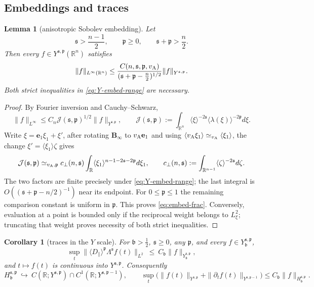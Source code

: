 \documentclass[11pt,reqno]{amsart}
\theoremstyle{plain}
\newtheorem{lemma}[theorem]{Lemma}
\newtheorem{corollary}[theorem]{Corollary}
\theoremstyle{definition}
\theoremstyle{remark}
\numberwithin{equation}{section}
\newcommand{\breg}{\mathfrak b}
\newcommand{\sreg}{\mathfrak s}
\newcommand{\preg}{\mathfrak p}
\newcommand{\Binf}{\mathbf B_\infty}
\newcommand{\Real}{\mathbb R}
\newcommand{\Rn}{\Real^n}
\begin{document}
\subsection{Embeddings and traces}

\begin{lemma}[anisotropic Sobolev embedding]\label{lem:Linftyembed}
Let
\begin{equation}\label{eq:Y-embed-range}
 \sreg>\frac{n-1}{2},\qquad \preg\ge0,\qquad \sreg+\preg>\frac n2 .
\end{equation}
Then every $f\in Y^{\sreg,\preg}(\Rn)$ satisfies
\begin{equation}\label{eq:embed-frac}
 \|f\|_{L^\infty(\Rn)}
 \le
 \frac{C(n,\sreg,\preg,v_{\rm A})}
 {(\sreg+\preg-\frac n2)^{1/2}}
 \|f\|_{Y^{\sreg,\preg}} .
\end{equation}
Both strict inequalities in \eqref{eq:Y-embed-range} are necessary.
\end{lemma}

\begin{proof}
By Fourier inversion and Cauchy--Schwarz,
\[
 \|f\|_{L^\infty}
 \le C_n\mathcal J(\sreg,\preg)^{1/2}\|f\|_{Y^{\sreg,\preg}},
 \qquad
 \mathcal J(\sreg,\preg)
 :=\int_{\Rn}
 \langle\xi\rangle^{-2\sreg}
 \langle\lambda(\xi)\rangle^{-2\preg} d\xi .
\]
Write $\xi=\mathbf e_1\xi_1+\xi'$, after rotating $\Binf$ to $v_{\rm A}\mathbf e_1$ and using
$\langle v_{\rm A}\xi_1\rangle\simeq_{v_{\rm A}}\langle\xi_1\rangle$, the change
$\xi'=\langle\xi_1\rangle\zeta$ gives
\[
 \mathcal J(\sreg,\preg)
 \simeq_{v_{\rm A},\preg}
 c_\perp(n,\sreg)
 \int_{\Real}\langle\xi_1\rangle^{n-1-2\sreg-2\preg} d\xi_1,
 \qquad
 c_\perp(n,\sreg)
 :=\int_{\Real^{n-1}}\langle\zeta\rangle^{-2\sreg} d\zeta .
\]
The two factors are finite precisely under \eqref{eq:Y-embed-range}; the last integral is
$O((\sreg+\preg-n/2)^{-1})$ near its endpoint.  For
$0\le\preg\le1$ the remaining comparison constant is uniform in $\preg$.
This proves \eqref{eq:embed-frac}.  Conversely, evaluation at a point is bounded only if the
reciprocal weight belongs to $L^2_\xi$; truncating that weight proves necessity of both strict
inequalities.
\end{proof}
\begin{corollary}[traces in the $Y$ scale]\label{cor:trace-Y}
For $\breg>\frac12$, $\sreg\ge0$, any $\preg$, and every
$f\in Y^{\sreg,\preg}_{\breg}$,
$$\sup_t\big\|\langle D_{\parallel}\rangle^{\preg}\Lambda^{\sreg}f(t)\big\|_{L^{2}}\ \le\
C_{\breg} \|f\|_{Y^{\sreg,\preg}_{\breg}},$$
and $t\mapsto f(t)$ is continuous into $Y^{\sreg,\preg}$. Consequently
\begin{equation}\label{eq:trace-class}
H^{\sreg,\preg}_{\breg}\ \hookrightarrow\ C(\Real;Y^{\sreg,\preg})\cap C^1(\Real;Y^{\sreg,\preg-1}),
\qquad
\sup_t\big(\|f(t)\|_{Y^{\sreg,\preg}}+\|\partial_tf(t)\|_{Y^{\sreg,\preg-1}}\big)
\le C_{\breg}\|f\|_{H^{\sreg,\preg}_{\breg}}.
\end{equation}
\end{corollary}
\end{document}
